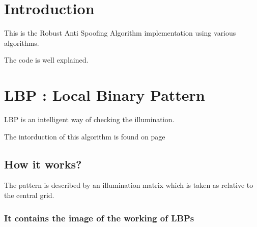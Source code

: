 \documentclass{article}
\begin{document}
\thispagestyle{empty}
\cleardoublepage %
\setcounter{page}{1}


\section{Introduction}\label{sec:intro}
This is the Robust Anti Spoofing Algorithm implementation using various algorithms.

The code is well explained.
\lipsum[1]

\newpage %
\section{LBP : Local Binary Pattern}
LBP is an intelligent way of checking the illumination. 

The intorduction of this algorithm is found on page \pageref{sec:intro}
\subsection{How it works?}
The pattern is described by an illumination matrix which is  taken as relative to the central grid.
\subsubsection{It contains the image of the working of LBPs}
\end{document}
